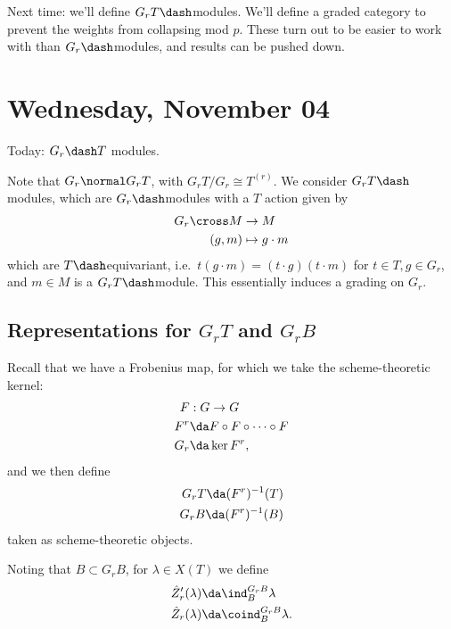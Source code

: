 Next time: we'll define \(G_rT\dash\)modules. We'll define a graded
category to prevent the weights from collapsing mod \(p\). These turn
out to be easier to work with than \(G_r\dash\)modules, and results can
be pushed down.

\hypertarget{wednesday-november-04}{%
\section{Wednesday, November 04}\label{wednesday-november-04}}

Today: \(G_r\dash T\) modules.

Note that \(G_r\normal G_r T\), with \(G_r T/G_r \cong T^{(r)}\). We
consider \(G_r T\dash\)modules, which are \(G_r\dash\)modules with a
\(T\) action given by
\begin{align*}  
G_r \cross M &\to M \\
(g, m) &\mapsto g\cdot m
\end{align*} which are \(T\dash\)equivariant,
i.e.~\(t(g\cdot m) = (t\cdot g)(t\cdot m)\) for \(t\in T, g\in G_r\),
and \(m\in M\) is a \(G_r T\dash\)module. This essentially induces a
grading on \(G_r\).

\hypertarget{representations-for-g_r-t-and-g_r-b}{%
\subsection{\texorpdfstring{Representations for \(G_r T\) and
\(G_r B\)}{Representations for G\_r T and G\_r B}}\label{representations-for-g_r-t-and-g_r-b}}

Recall that we have a Frobenius map, for which we take the
scheme-theoretic kernel:
\begin{align*}  
F&: G \to G \\ 
F^r &\da F\circ F \circ \cdots \circ F \\
G_r &\da \ker F^r
,\end{align*} and we then define
\begin{align*}  
G_r T \da (F^r)^{-1} (T) \\
G_r B \da (F^r)^{-1} (B) 
\end{align*} taken as scheme-theoretic objects.

Noting that \(B\subset G_r B\), for \(\lambda \in X(T)\) we define
\begin{align*}  
\hat{Z}_r' (\lambda) &\da \ind_B^{G_r B} \lambda \\
\hat{Z}_r (\lambda) &\da \coind_B^{G_r B} \lambda
.\end{align*}

